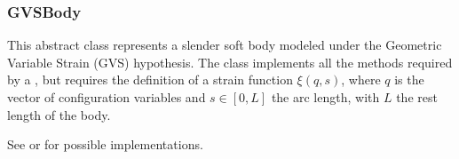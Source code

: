 \documentclass[letterpaper,10pt,english]{sphinxmanual}
\begin{document}
\sphinxstepscope


\subsubsection{GVSBody}
\label{\detokenize{gvsbody:gvsbody}}\label{\detokenize{gvsbody::doc}}\label{\detokenize{gvsbody:module-classes}}
\sphinxAtStartPar
This abstract class represents a slender soft body modeled under the Geometric Variable Strain (GVS) hypothesis.
The class implements all the methods required by a {\hyperref[\detokenize{body:Body}]{}}, but requires the definition of a strain function \(\xi(q, s)\), where \(q\) is the vector of configuration variables
and \(s \in [0, L]\) the arc length, with \(L\) the rest length of the body.

\sphinxAtStartPar
See {\hyperref[\detokenize{PCC/pcc2d:PCC2D}]{}} or {\hyperref[\detokenize{PCC/pcc3d:PCC3D}]{}} for possible implementations.
\end{document}

